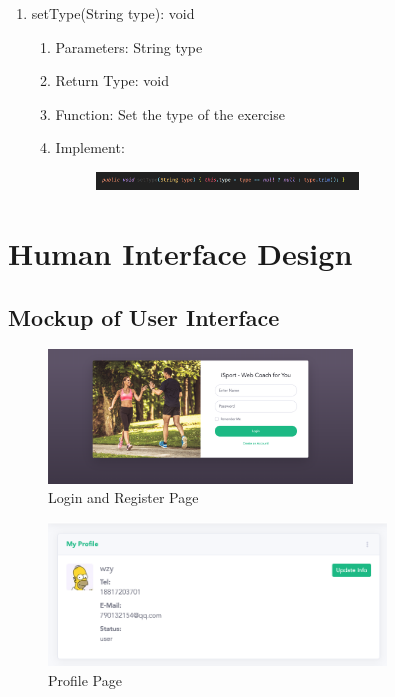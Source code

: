 \documentclass[16pt]{scrreprt}
\begin{document}
\begin{enumerate}
		\item setType(String type): void
	\begin{enumerate}
		\item Parameters: String type
		\item Return Type: void
		\item Function: Set the type of the exercise
		\item Implement:
		\begin{figure}[H]
	\centering
	\includegraphics[width=0.7\textwidth]{diagrams/ex-settype.png}\\
\end{figure}
	\end{enumerate}
	
	
\end{enumerate}



 


\chapter{Human Interface Design}

\section{Mockup of User Interface}
\begin{figure}[H]
	\centering
	\includegraphics[width=0.72\textwidth]{diagrams/login_register.png}
	\caption{Login and Register Page}
\end{figure}

\begin{figure}[H]
	\centering
	\includegraphics[width=0.8\textwidth]{diagrams/profile.png}
	\caption{Profile Page}
\end{figure}
\end{document}
